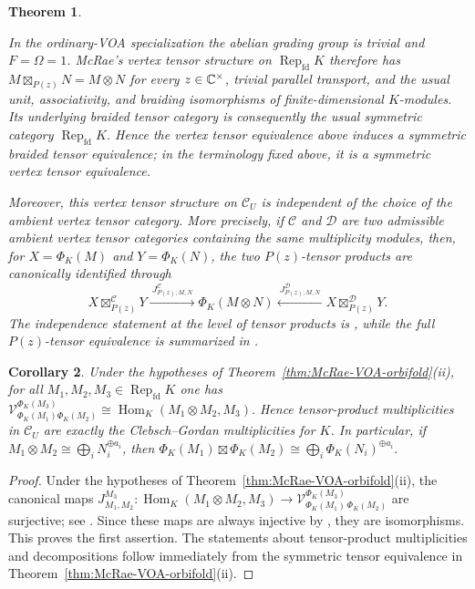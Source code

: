\documentclass[10pt,a4paper]{amsart}
\numberwithin{equation}{section} \newtheorem{thm}{Theorem}[section] \newtheorem{lem}[thm]{Lemma} \newtheorem{ex}[thm]{Example} \newtheorem{prop}[thm]{Proposition} \newtheorem{cor}[thm]{Corollary} \newtheorem{defi}[thm]{Definition} \newtheorem{rmk}[thm]{Remark} \newtheorem{notation}[thm]{Notation}
\newcommand{\Rep}{\operatorname{Rep}}
\newcommand{\Hom}{\operatorname{Hom}}
\begin{document}
\begin{thm}
\begin{enumerate}[label=\textnormal{(\roman*)}]
In the ordinary-VOA specialization the abelian grading group is trivial and $F=\Omega=1$. McRae's vertex tensor structure on $\Rep_{\mathrm{fd}}K$ therefore has \(M\boxtimes_{P(z)}N=M\otimes N\) for every $z\in\mathbb{C}^\times$, trivial parallel transport, and the usual unit, associativity, and braiding isomorphisms of finite-dimensional $K$-modules. Its underlying braided tensor category is consequently the usual symmetric category $\Rep_{\mathrm{fd}}K$. Hence the vertex tensor equivalence above induces a symmetric braided tensor equivalence; in the terminology fixed above, it is a symmetric vertex tensor equivalence.

Moreover, this vertex tensor structure on $\mathcal C_U$ is independent of the choice of the ambient vertex tensor category. More precisely, if $\mathcal C$ and $\mathcal D$ are two admissible ambient vertex tensor categories containing the same multiplicity modules, then, for $X=\Phi_K(M)$ and $Y=\Phi_K(N)$, the two $P(z)$-tensor products are canonically identified through
\[
 X\boxtimes^{\mathcal C}_{P(z)}Y
 \xrightarrow{\ J^{\mathcal C}_{P(z);M,N}\ }
 \Phi_K(M\otimes N)
 \xleftarrow{\ J^{\mathcal D}_{P(z);M,N}\ }
 X\boxtimes^{\mathcal D}_{P(z)}Y.
\]
The independence statement at the level of tensor products is \cite[Remark~4.9]{McRae}, while the full $P(z)$-tensor equivalence is summarized in \cite[Remark~4.10]{McRae}.
\end{enumerate}
\end{thm}

\begin{cor}\label{cor:McRae-VOA-fusion}
Under the hypotheses of Theorem~\ref{thm:McRae-VOA-orbifold}(ii), for all $M_1,M_2,M_3\in\Rep_{\mathrm{fd}}K$ one has \(\mathcal V^{\Phi_K(M_3)}_{\Phi_K(M_1) \Phi_K(M_2)}\cong\Hom_K(M_1\otimes M_2,M_3).\) Hence tensor-product multiplicities in $\mathcal C_U$ are exactly the Clebsch--Gordan multiplicities for $K$. In particular, if \(M_1\otimes M_2\cong\bigoplus_i N_i^{\oplus a_i}\), then \(\Phi_K(M_1)\boxtimes\Phi_K(M_2)\cong\bigoplus_i\Phi_K(N_i)^{\oplus a_i}.\)
\end{cor}

\begin{proof}
Under the hypotheses of Theorem~\ref{thm:McRae-VOA-orbifold}(ii), the canonical maps \(J^{M_3}_{M_1,M_2}: \Hom_K(M_1\otimes M_2,M_3) \longrightarrow \mathcal V^{\Phi_K(M_3)}_{\Phi_K(M_1)\,\Phi_K(M_2)}\) are surjective; see \cite[\S4]{McRae}. Since these maps are always injective by \cite[\S3.2]{McRae}, they are isomorphisms. This proves the first assertion. The statements about tensor-product multiplicities and decompositions follow immediately from the symmetric tensor equivalence in Theorem~\ref{thm:McRae-VOA-orbifold}(ii).
\end{proof}
\end{document}

